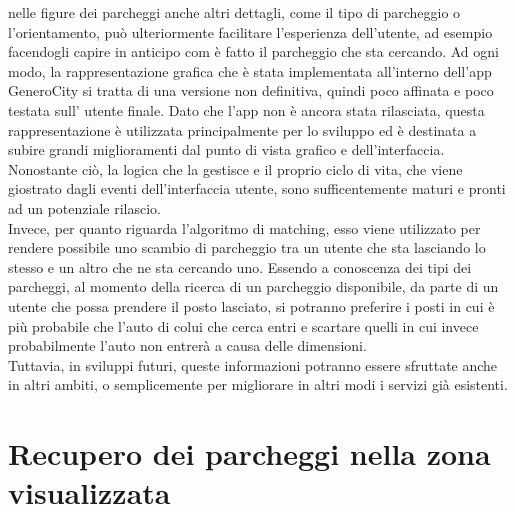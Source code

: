 nelle figure dei parcheggi anche altri dettagli, come il tipo di parcheggio o 
l'orientamento, può ulteriormente facilitare l'esperienza dell'utente, ad esempio
facendogli capire in anticipo com è fatto il parcheggio che sta cercando.
Ad ogni modo, la rappresentazione grafica che è stata implementata all'interno
dell'app GeneroCity si tratta di una versione non definitiva, quindi poco affinata e poco
testata sull' utente finale. Dato che l'app non è ancora stata rilasciata, questa 
rappresentazione è utilizzata principalmente per lo sviluppo ed è destinata a subire
grandi miglioramenti dal punto di vista grafico e dell'interfaccia. Nonostante ciò,
la logica che la gestisce e il proprio ciclo di vita, che viene giostrato dagli eventi
dell'interfaccia utente, sono sufficentemente maturi e pronti ad un potenziale rilascio.\\
Invece, per quanto riguarda l'algoritmo di matching, esso viene utilizzato per 
rendere possibile uno scambio di parcheggio tra un utente che sta lasciando lo 
stesso e un altro che ne sta cercando uno. Essendo a conoscenza dei tipi dei 
parcheggi, al momento della ricerca di un parcheggio disponibile, da parte di un
utente che possa prendere il posto lasciato, si potranno preferire i posti in cui
è più probabile che l'auto di colui che cerca entri e scartare quelli in cui invece
probabilmente l'auto non entrerà a causa delle dimensioni.\\
Tuttavia, in sviluppi futuri, queste informazioni potranno essere sfruttate anche in
altri ambiti, o semplicemente per migliorare in altri modi i servizi già esistenti.


\section{Recupero dei parcheggi nella zona visualizzata} 

